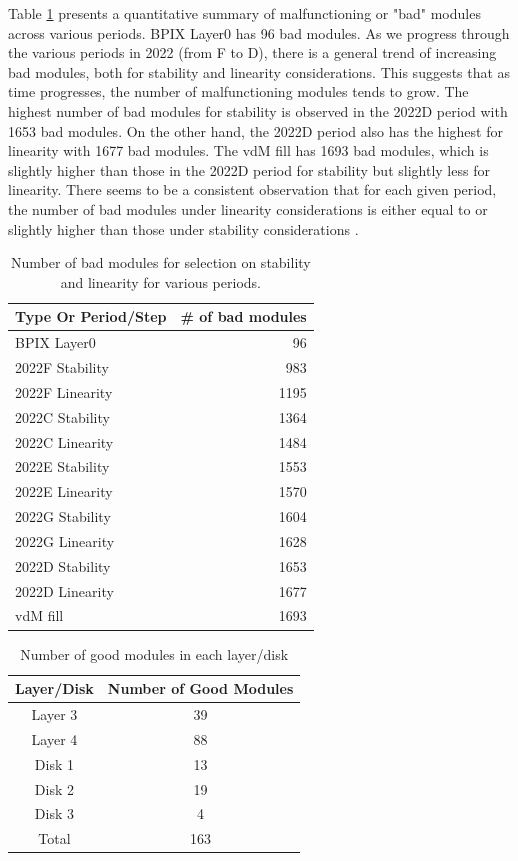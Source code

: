 Table \ref{tab:bad_modules} presents a quantitative summary of malfunctioning or "bad" modules across various periods. BPIX Layer0 has 96 bad modules. As we progress through the various periods in 2022 (from F to D), there is a general trend of increasing bad modules, both for stability and linearity considerations. This suggests that as time progresses, the number of malfunctioning modules tends to grow. The highest number of bad modules for stability is observed in the 2022D period with 1653 bad modules. On the other hand, the 2022D period also has the highest for linearity with 1677 bad modules. The vdM fill has 1693 bad modules, which is slightly higher than those in the 2022D period for stability but slightly less for linearity. There seems to be a consistent observation that for each given period, the number of bad modules under linearity considerations is either equal to or slightly higher than those under stability considerations \cite{bril2023moduleveto}.

\begin{table}[h]
  \centering
  \caption[Bad modules per period]{Number of bad modules for selection on stability and linearity for various periods.}
\begin{tabular}{lr}
\textbf{Type Or Period/Step} & \textbf{\# of bad modules} \\
\hline
BPIX Layer0 & 96 \\
2022F Stability & 983 \\
2022F Linearity & 1195 \\
2022C Stability & 1364 \\
2022C Linearity & 1484 \\
2022E Stability & 1553 \\
2022E Linearity & 1570 \\
2022G Stability & 1604 \\
2022G Linearity & 1628 \\
2022D Stability & 1653 \\
2022D Linearity & 1677 \\
vdM fill & 1693 \\
\end{tabular}
\label{tab:bad_modules}
\end{table}


\begin{table}
\centering
\caption{Number of good modules in each layer/disk}
\label{tab:2022ldmodules}
\begin{tabular}{cc}
\textbf{Layer/Disk} & \textbf{Number of Good Modules} \\
\hline
Layer 3 & 39 \\
Layer 4 & 88 \\
Disk 1 & 13 \\
Disk 2 &  19\\
Disk 3 &  4\\
Total & 163\\
\end{tabular}
\end{table}

